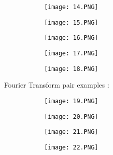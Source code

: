 \documentclass{article}
\begin{document}
 \begin{figure}[ht!]
  \centering
  \begin{subfigure}[b]{0.8\linewidth}
    \texttt{[image: 14.PNG]}
  \end{subfigure}
\end{figure}

 \begin{figure}[ht!]
  \centering
  \begin{subfigure}[b]{0.5\linewidth}
    \texttt{[image: 15.PNG]}
  \end{subfigure}
     \begin{subfigure}[b]{0.49\textwidth}
         \centering
         \texttt{[image: 16.PNG]}
     \end{subfigure}
\end{figure}


 \begin{figure}[ht!]
  \centering
  \begin{subfigure}[b]{0.5\linewidth}
    \texttt{[image: 17.PNG]}
  \end{subfigure}
     \begin{subfigure}[b]{0.49\textwidth}
         \centering
         \texttt{[image: 18.PNG]}
     \end{subfigure}
\end{figure}

Fourier Transform pair examples :

 \begin{figure}[ht!]
  \centering
  \begin{subfigure}[b]{0.5\linewidth}
    \texttt{[image: 19.PNG]}
  \end{subfigure}
     \begin{subfigure}[b]{0.49\textwidth}
         \centering
         \texttt{[image: 20.PNG]}
     \end{subfigure}
\end{figure}


 \begin{figure}[ht!]
  \centering
  \begin{subfigure}[b]{0.5\linewidth}
    \texttt{[image: 21.PNG]}
  \end{subfigure}
     \begin{subfigure}[b]{0.49\textwidth}
         \centering
         \texttt{[image: 22.PNG]}
     \end{subfigure}
\end{figure}
\end{document}
